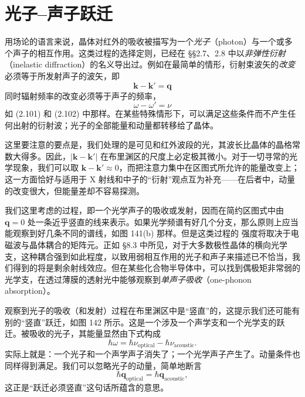 \section{光子–声子跃迁}

用场论的语言来说，晶体对红外的吸收被描写为一个\emph{光子}（photon）与一个或多个声子的相互作用。这类过程的选择定则，已经在 §§2.7、2.8 中以\emph{非弹性衍射}（inelastic diffraction）的名义导出过。例如在最简单的情形，衍射束波矢的\emph{改变}必须等于所发射声子的波矢，即
\begin{equation*}
\mathbf{k}-\mathbf{k}' = \mathbf{q}\tag{8.64}
\end{equation*}
同时辐射频率的改变必须等于声子的频率，
\begin{equation*}
\omega-\omega' = \nu\tag{8.65}
\end{equation*}
如 (2.101) 和 (2.102) 中那样。在某些特殊情形下，可以满足这些条件而不产生任何出射的衍射波；光子的全部能量和动量都转移给了晶体。

这里要注意的要点是，我们处理的是可见和红外波段的光，其波长比晶体的晶格常数大得多。因此，$|\mathbf{k}-\mathbf{k}'|$ 在布里渊区的尺度上必定极其微小。对于一切寻常的光学现象，我们可以取 $\mathbf{k}-\mathbf{k}'\approx 0$，而把注意力集中在区图式所允许的能量改变上；这一方面恰好与适用于 X 射线和中子的“衍射”观点互为补充——在后者中，动量的改变很大，但能量差却不容易探测。

我们这里考虑的过程，即一个光学声子的吸收或发射，因而在简约区图式中由 $\mathbf{q}=0$ 处一条近乎竖直的线来表示。如果光学频谱有好几个分支，那么原则上应当能观察到好几条不同的谱线，如图 141(b) 那样。但是这类过程的
强度将取决于电磁波与晶体耦合的矩阵元。正如 §8.3 中所见，对于大多数极性晶体的横向光学支，这种耦合强到如此程度，以致用弱相互作用的光子和声子来描述已不恰当，我们得到的将是剩余射线效应。但在某些化合物半导体中，可以找到偶极矩非常弱的光学支，在透过薄膜的透射光中能够观察到\emph{单声子吸收}（one-phonon absorption）。


观察到光子的吸收（和发射）过程在布里渊区中是“竖直”的，这提示我们还可能有别的“竖直”跃迁，如图 142 所示。这是一个涉及一个声学支和一个光学支的跃迁。被吸收的光子，其能量显然由下式构成
\begin{equation*}
\hbar\omega = \hbar\nu_{\mathrm{optical}} - \hbar\nu_{\mathrm{acoustic}}.\tag{8.66}
\end{equation*}
实际上就是：一个光子和一个声学声子消失了；一个光学声子产生了。动量条件也同样得到满足。我们可以忽略光子的动量，简单地断言
\begin{equation*}
\hbar\mathbf{q}_{\mathrm{optical}} = \hbar\mathbf{q}_{\mathrm{acoustic}},\tag{8.67}
\end{equation*}
这正是“跃迁必须竖直”这句话所蕴含的意思。


